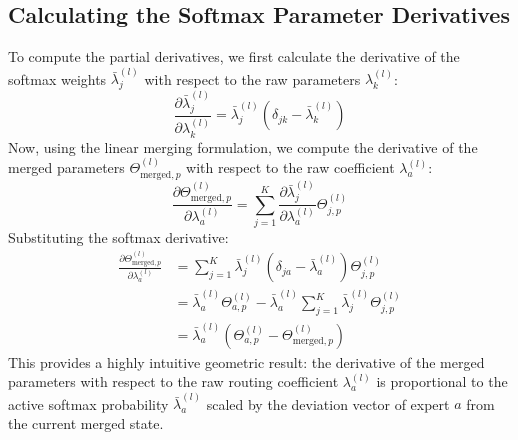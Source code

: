 \documentclass{article}
\theoremstyle{plain}
\theoremstyle{definition}
\theoremstyle{remark}
\begin{document}
\subsection{Calculating the Softmax Parameter Derivatives}
To compute the partial derivatives, we first calculate the derivative of the softmax weights $\bar{\lambda}_j^{(l)}$ with respect to the raw parameters $\lambda_k^{(l)}$:
\begin{equation}
    \frac{\partial \bar{\lambda}_j^{(l)}}{\partial \lambda_k^{(l)}} = \bar{\lambda}_j^{(l)} (\delta_{jk} - \bar{\lambda}_k^{(l)})
\end{equation}
Now, using the linear merging formulation, we compute the derivative of the merged parameters $\Theta_{\text{merged}, p}^{(l)}$ with respect to the raw coefficient $\lambda_a^{(l)}$:
\begin{equation}
    \frac{\partial \Theta_{\text{merged}, p}^{(l)}}{\partial \lambda_a^{(l)} } = \sum_{j=1}^K \frac{\partial \bar{\lambda}_j^{(l)}}{\partial \lambda_a^{(l)}} \Theta_{j, p}^{(l)}
\end{equation}
Substituting the softmax derivative:
\begin{align}
    \frac{\partial \Theta_{\text{merged}, p}^{(l)}}{\partial \lambda_a^{(l)}} &= \sum_{j=1}^K \bar{\lambda}_j^{(l)} (\delta_{ja} - \bar{\lambda}_a^{(l)}) \Theta_{j, p}^{(l)} \\
    &= \bar{\lambda}_a^{(l)} \Theta_{a, p}^{(l)} - \bar{\lambda}_a^{(l)} \sum_{j=1}^K \bar{\lambda}_j^{(l)} \Theta_{j, p}^{(l)} \\
    &= \bar{\lambda}_a^{(l)} \left( \Theta_{a, p}^{(l)} - \Theta_{\text{merged}, p}^{(l)} \right)
\end{align}
This provides a highly intuitive geometric result: the derivative of the merged parameters with respect to the raw routing coefficient $\lambda_a^{(l)}$ is proportional to the active softmax probability $\bar{\lambda}_a^{(l)}$ scaled by the deviation vector of expert $a$ from the current merged state.
\end{document}
